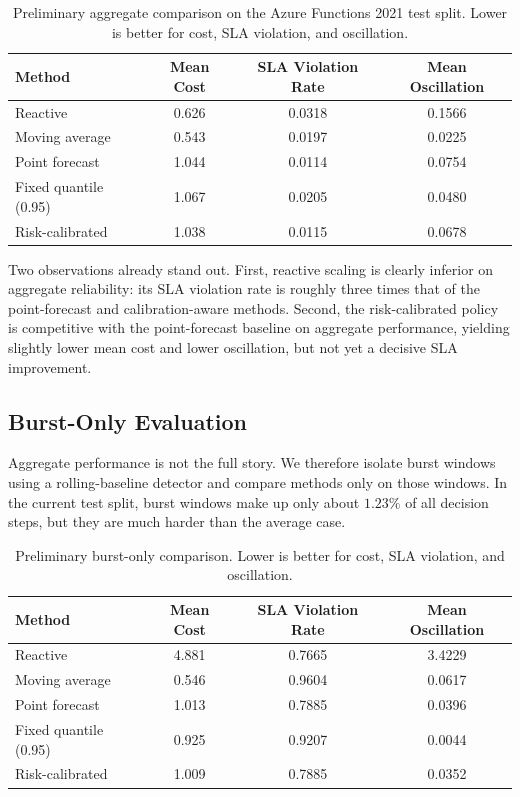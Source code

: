 \documentclass[11pt]{article}
\theoremstyle{plain}
\theoremstyle{definition}
\theoremstyle{remark}
\begin{document}
\begin{table}[h]
\centering
\caption{Preliminary aggregate comparison on the Azure Functions 2021 test split. Lower is better for cost, SLA violation, and oscillation.}
\label{tab:aggregate-results}
\begin{tabular}{lccc}
\toprule
Method & Mean Cost & SLA Violation Rate & Mean Oscillation \\
\midrule
Reactive & 0.626 & 0.0318 & 0.1566 \\
Moving average & 0.543 & 0.0197 & 0.0225 \\
Point forecast & 1.044 & 0.0114 & 0.0754 \\
Fixed quantile (0.95) & 1.067 & 0.0205 & 0.0480 \\
Risk-calibrated & 1.038 & 0.0115 & 0.0678 \\
\bottomrule
\end{tabular}
\end{table}

Two observations already stand out. First, reactive scaling is clearly inferior on aggregate reliability: its SLA violation rate is roughly three times that of the point-forecast and calibration-aware methods. Second, the risk-calibrated policy is competitive with the point-forecast baseline on aggregate performance, yielding slightly lower mean cost and lower oscillation, but not yet a decisive SLA improvement.

\subsection{Burst-Only Evaluation}
Aggregate performance is not the full story. We therefore isolate burst windows using a rolling-baseline detector and compare methods only on those windows. In the current test split, burst windows make up only about $1.23\%$ of all decision steps, but they are much harder than the average case.

\begin{table}[h]
\centering
\caption{Preliminary burst-only comparison. Lower is better for cost, SLA violation, and oscillation.}
\label{tab:burst-results}
\begin{tabular}{lccc}
\toprule
Method & Mean Cost & SLA Violation Rate & Mean Oscillation \\
\midrule
Reactive & 4.881 & 0.7665 & 3.4229 \\
Moving average & 0.546 & 0.9604 & 0.0617 \\
Point forecast & 1.013 & 0.7885 & 0.0396 \\
Fixed quantile (0.95) & 0.925 & 0.9207 & 0.0044 \\
Risk-calibrated & 1.009 & 0.7885 & 0.0352 \\
\bottomrule
\end{tabular}
\end{table}
\end{document}
